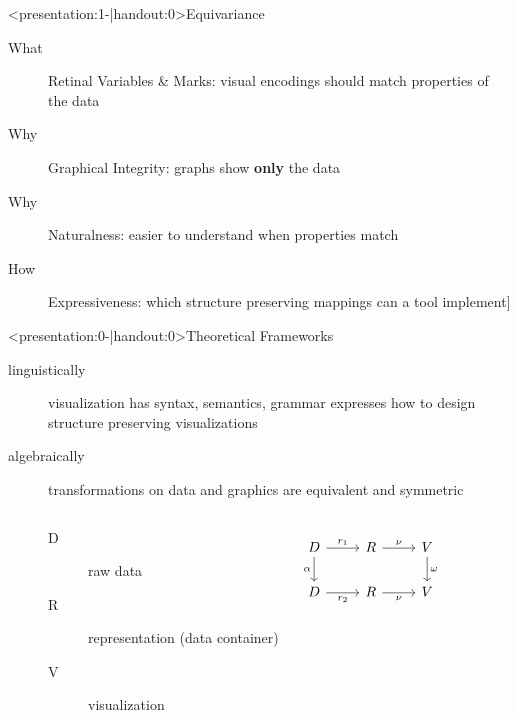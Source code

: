 \documentclass[xcolor={dvipsnames}]{beamer}
\begin{document}
\begin{frame}<presentation:1-|handout:0>{Equivariance}
    \begin{description}
        \item[What] Retinal Variables \& Marks: visual encodings should match properties of the data \cite{bertinSemiologyGraphicsDiagrams2011a}
        \pause
        \item[Why] Graphical Integrity: graphs show \textbf{only} the data\cite{tufteVisualDisplayQuantitative2001}
        \pause 
        \item[Why] Naturalness: easier to understand when properties match\cite{norman_things_smart}
        \pause
        \item[How] Expressiveness: which structure preserving mappings can a tool implement\cite{mackinlayAutomatingDesignGraphical1986}] 
    \end{description}
\end{frame}

\begin{frame}<presentation:0-|handout:0>{Theoretical Frameworks}
    \begin{description}
        \item[linguistically] visualization has syntax, semantics, grammar expresses how to design structure preserving visualizations
        \cite{mackinlayAutomatingDesignGraphical1986,mackinlayAUTOMATICDESIGNGRAPHICAL1987,wilkinsonGrammarGraphics2005}

        \item[algebraically] transformations on data and graphics are equivalent and symmetric \cite{kindlmannAlgebraicProcessVisualization2014}
        \begin{columns}
            \begin{description}
                \item[D] raw data 
                \item[R] representation (data container) 
                \item[V] visualization
            \end{description}
            \begin{equation*}
                \begin{tikzcd}[ampersand replacement=\&]
                    D \arrow[d, "\alpha"'] \arrow[r, "r_1"] \& R \arrow[r, "\nu"]  \& V \arrow[d, "\omega"] \\
                    D \arrow[r, "r_2"']                     \& R \arrow[r, "\nu"'] \& V                    
                \end{tikzcd}
            \end{equation*}
        \end{columns} 
    \end{description}
\end{frame}
\end{document}
